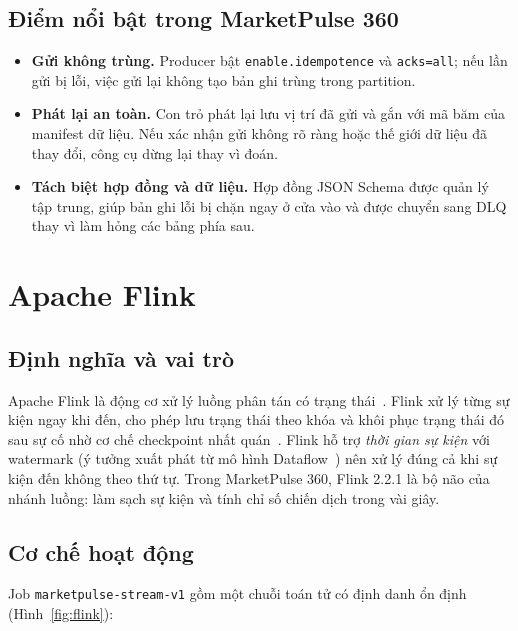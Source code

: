 \subsection{Điểm nổi bật trong MarketPulse 360}
\label{sec:c3-kafka-hien-thuc}
\begin{itemize}
    \item \textbf{Gửi không trùng.} Producer bật \texttt{enable.idempotence} và \texttt{acks=all}; nếu lần gửi bị lỗi, việc gửi lại không tạo bản ghi trùng trong partition.
    \item \textbf{Phát lại an toàn.} Con trỏ phát lại lưu vị trí đã gửi và gắn với mã băm của manifest dữ liệu. Nếu xác nhận gửi không rõ ràng hoặc thế giới dữ liệu đã thay đổi, công cụ dừng lại thay vì đoán.
    \item \textbf{Tách biệt hợp đồng và dữ liệu.} Hợp đồng JSON Schema được quản lý tập trung, giúp bản ghi lỗi bị chặn ngay ở cửa vào và được chuyển sang DLQ thay vì làm hỏng các bảng phía sau.
\end{itemize}

\section{Apache Flink}
\label{sec:c3-flink}

\subsection{Định nghĩa và vai trò}
\label{sec:c3-flink-dinh-nghia}
Apache Flink là động cơ xử lý luồng phân tán có trạng thái~\cite{carbone2015flink, flinkdocs}. Flink xử lý từng sự kiện ngay khi đến, cho phép lưu trạng thái theo khóa và khôi phục trạng thái đó sau sự cố nhờ cơ chế checkpoint nhất quán~\cite{carbone2017state}. Flink hỗ trợ \emph{thời gian sự kiện} với watermark (ý tưởng xuất phát từ mô hình Dataflow~\cite{akidau2015dataflow}) nên xử lý đúng cả khi sự kiện đến không theo thứ tự. Trong MarketPulse 360, Flink 2.2.1 là bộ não của nhánh luồng: làm sạch sự kiện và tính chỉ số chiến dịch trong vài giây.

\subsection{Cơ chế hoạt động}
\label{sec:c3-flink-co-che}
Job \texttt{marketpulse-stream-v1} gồm một chuỗi toán tử có định danh ổn định (Hình~\ref{fig:flink}):

